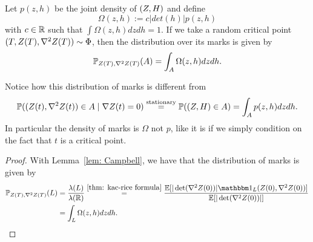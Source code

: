 \begin{corollary}
	Let \(p(z,h)\) be the joint density of \((Z, H)\) and define
	\[
		\Omega(z,h) := c |det(h)| p(z,h)
	\]
	with \(c\in\mathbb{R}\) such that \(\int \Omega(z,h)dz dh = 1\).
	If we take a random critical point \((T,Z(T),\nabla^2Z(T))\sim \Phi\),
	then the distribution over its marks is given by
	\[
		\mathbb{P}_{Z(T),\nabla^2Z(T)}(A) = \int_A \Omega(z,h) dz dh.
	\]
\end{corollary}
\begin{remark}
	Notice how this distribution of marks is different from
	\[
		\mathbb{P}((Z(t),\nabla^2Z(t))\in A \mid \nabla Z(t) = 0)
		\overset{\text{stationary}}
		= \mathbb{P}((Z,H)\in A)
		= \int_A p(z,h)dz dh.
	\]
	In particular the density of marks is \(\Omega\) not \(p\), like it is if
	we simply condition on the fact that \(t\) is a critical point.
\end{remark}
\begin{proof}
	With Lemma~\ref{lem: Campbell}, we have that the distribution of marks is
	given by
	\begin{align*}
		\Pr_{\rf(T),\nabla^2\rf(T)}(L)
		&= \frac{\lambda(L)}{\lambda(\real)}
		\overset{\ref{thm: kac-rice formula}}= \frac{
			\E[|\det(\nabla^2 \rf(0))|
			\ind_L(\rf(0), \nabla^2\rf(0))
			]
		}{
			\E[|\det(\nabla^2 \rf(0))|]
		}\\
		&= \int_L \Omega(z,h) dz dh.
		\qedhere
	\end{align*}
\end{proof}

